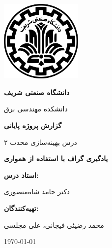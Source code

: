 \documentclass[12pt,onecolumn,a4paper]{article}
\begin{document}
	\begin{titlepage}
		\begin{center}
			
			\includegraphics[width=4cm]{assets/logo-sharif.png} %
			
			\vspace{1cm}
			
			{\huge \textbf{دانشگاه صنعتی شریف}}  
			
			\vspace{0.5cm}
			
			{\Large دانشکده مهندسی برق}
			
			\vspace{1.5cm}
			
			{\Huge \textbf{گزارش پروژه پایانی}} 
			
			\vspace{0.5cm}
			
			{\Large درس بهینه‌سازی محدب ۲}
			
			\vspace{1.5cm}
			
			{\Huge \textbf{یادگیری گراف با استفاده از همواری}}
			
			\vspace{1.5cm}
			
			\textbf{\Large استاد درس:}  
			
			\vspace{0.5cm}
			
			{\Large دکتر حامد شاه‌منصوری}
			
			\vspace{1.5cm}
			
			\textbf{\Large تهیه‌کنندگان:}  
			
			\vspace{0.5cm}
			
			{\Large محمد رضیئی فیجانی، علی مجلسی}
			
			\vfill
			
			{\Large \today}
			
		\end{center}
	\end{titlepage}
	
\end{document}
